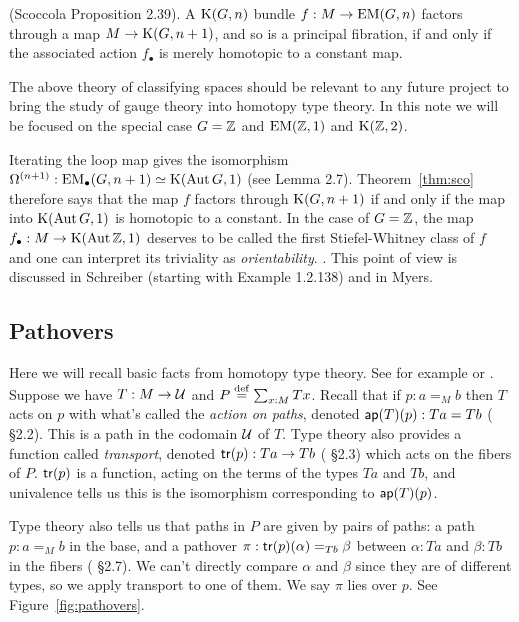 \begin{mythm}
\label{thm:sco}
(Scoccola\cite{sco} Proposition 2.39). A \( \mathrm{K}(G,n) \) bundle \( f:M\to\mathrm{EM}(G,n) \) factors through a map \( M\to\mathrm{K}(G,n+1) \), and so is a principal fibration, if and only if the associated action \( f_\bullet \) is merely homotopic to a constant map.
\end{mythm}

The above theory of classifying spaces should be relevant to any future project to bring the study of gauge theory into homotopy type theory. In this note we will be focused on the special case \( G=\mathbb{Z} \) and \( \mathrm{EM}(\mathbb{Z},1) \) and \( \mathrm{K}(\mathbb{Z},2) \).

\begin{mynote}
Iterating the loop map gives the isomorphism \( \Omega^{(n+1)}:\mathrm{EM_{\bullet}}(G,n+1)\simeq \mathrm{K}(\operatorname{Aut} G,1) \) (see \cite{sco} Lemma 2.7). Theorem~\ref{thm:sco} therefore says that the map \( f \) factors through \( \mathrm{K}(G,n+1) \) if and only if the map into \( \mathrm{K}(\operatorname{Aut} G,1) \) is homotopic to a constant. In the case of \( G=\mathbb{Z} \), the map \( f_\bullet:M\to \mathrm{K}(\operatorname{Aut} \mathbb{Z}, 1) \) deserves to be called the first Stiefel-Whitney class of \( f \) and one can interpret its triviality as \emph{orientability}. . This point of view is discussed in Schreiber\cite{dcct} (starting with Example 1.2.138) and in Myers\cite{myersgood}.
\end{mynote}

\subsection{Pathovers}
\label{sec:pathovers}
Here we will recall basic facts from homotopy type theory. See for example \cite{hottbook} or \cite{egbert}. Suppose we have \( T:M\to\mathcal{U} \) and \( P\stackrel{\mathrm{def}}{=}\sum_{x:M}Tx \). Recall that if \( p:a=_M b \) then \( T \) acts on \( p \) with what's called the \emph{action on paths}, denoted \( \mathsf{ap}(T)(p):Ta=Tb \) (\cite{hottbook} §2.2). This is a path in the codomain \( \mathcal{U} \) of \( T \). Type theory also provides a function called \emph{transport}, denoted \( \mathsf{tr}(p):Ta\to Tb \) (\cite{hottbook} §2.3) which acts on the fibers of \( P \). \( \mathsf{tr}(p) \) is a function, acting on the terms of the types \( Ta \) and \( Tb \), and univalence tells us this is the isomorphism corresponding to \( \mathsf{ap}(T)(p) \).

Type theory also tells us that paths in \( P \) are given by pairs of paths: a path \( p:a=_M b \) in the base, and a pathover \( \pi:\mathsf{tr}(p)(\alpha)=_{Tb}\beta \) between \( \alpha:Ta \) and \( \beta:Tb \) in the fibers (\cite{hottbook} §2.7). We can't directly compare \( \alpha \) and \( \beta \) since they are of different types, so we apply transport to one of them. We say \( \pi \) lies over \( p \). See Figure~\ref{fig:pathovers}.


